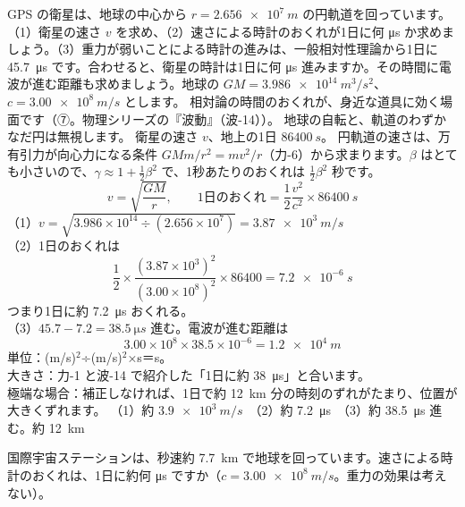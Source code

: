 \label{ph:原-11:ex6}
\begin{phreidai}
GPS の衛星は、地球の中心から $r=\qty{2.656e7}{m}$ の円軌道を回っています。（1）衛星の速さ $v$ を求め、（2）速さによる時計のおくれが1日に何 \si{\micro s} か求めましょう。（3）重力が弱いことによる時計の進みは、一般相対性理論から1日に \qty{45.7}{\micro s} です。合わせると、衛星の時計は1日に何 \si{\micro s} 進みますか。その時間に電波が進む距離も求めましょう。地球の $GM=\qty{3.986e14}{m^3/s^2}$、$c=\qty{3.00e8}{m/s}$ とします。
\phbamen
相対論の時間のおくれが、身近な道具に効く場面です（⑦。物理シリーズの『波動』（波-14））。
\phmushi
地球の自転と、軌道のわずかなだ円は無視します。
\phzu
衛星の速さ $v$、地上の1日 $\qty{86400}{s}$。
\phriyu
円軌道の速さは、万有引力が向心力になる条件 $GMm/r^2=mv^2/r$（力-6）から求まります。$\beta$ はとても小さいので、$\gamma\approx1+\tfrac12\beta^2$ で、1秒あたりのおくれは $\tfrac12\beta^2$ 秒です。
\phtateru
\[ v=\sqrt{\frac{GM}{r}},\qquad\text{1日のおくれ}=\frac12\frac{v^2}{c^2}\times\qty{86400}{s} \]
\phtoku
（1）$v=\sqrt{3.986\times10^{14}\div(2.656\times10^7)}=\qty{3.87e3}{m/s}$\\
（2）1日のおくれは
\[ \frac12\times\frac{(3.87\times10^3)^2}{(3.00\times10^8)^2}\times86400=\qty{7.2e-6}{s} \]
つまり1日に約 \qty{7.2}{\micro s} おくれる。\\
（3）$45.7-7.2=\qty{38.5}{\micro s}$ 進む。電波が進む距離は
\[ 3.00\times10^8\times38.5\times10^{-6}=\qty{1.2e4}{m} \]
\phtashikame
単位：(m/s)$^2$÷(m/s)$^2$×s＝s。\\
大きさ：力-1 と波-14 で紹介した「1日に約 \qty{38}{\micro s}」と合います。\\
極端な場合：補正しなければ、1日で約 \qty{12}{km} 分の時刻のずれがたまり、位置が大きくずれます。
\kotae （1）約 $\qty{3.9e3}{m/s}$　（2）約 \qty{7.2}{\micro s}　（3）約 \qty{38.5}{\micro s} 進む。約 \qty{12}{km}
\end{phreidai}
\begin{jibun}
国際宇宙ステーションは、秒速約 \qty{7.7}{km} で地球を回っています。速さによる時計のおくれは、1日に約何 \si{\micro s} ですか（$c=\qty{3.00e8}{m/s}$。重力の効果は考えない）。
\end{jibun}

